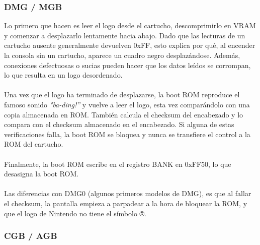 \subsubsection{DMG / MGB}
Lo primero que hacen es leer el logo desde el cartucho, descomprimirlo en VRAM y comenzar a desplazarlo lentamente hacia abajo. Dado que las lecturas de un cartucho ausente generalmente devuelven 0xFF, esto explica por qué, al encender la consola sin un cartucho, aparece un cuadro negro desplazándose. Además, conexiones defectuosas o sucias pueden hacer que los datos leídos se corrompan, lo que resulta en un logo desordenado.
\\\\
Una vez que el logo ha terminado de desplazarse, la boot ROM reproduce el famoso sonido \textit{"ba-ding!”} y vuelve a leer el logo, esta vez comparándolo con una copia almacenada en ROM. También calcula el checksum del encabezado y lo compara con el checksum almacenado en el encabezado. Si alguna de estas verificaciones falla, la boot ROM se bloquea y nunca se transfiere el control a la ROM del cartucho.
\\\\
Finalmente, la boot ROM escribe en el registro BANK en 0xFF50, lo que desasigna la boot ROM.
\\\\
Las diferencias con DMG0 (algunos primeros modelos de DMG), es que al fallar el checksum, la pantalla empieza a parpadear a la hora de bloquear la ROM, y que el logo de Nintendo no tiene el símbolo ®.

\subsubsection{CGB / AGB}

